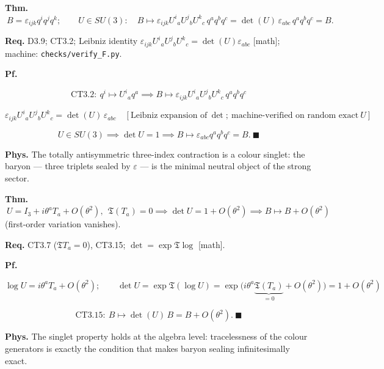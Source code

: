 \begin{theorem}\label{tag:CT3-15}
\textbf{Thm.} $\ B=\varepsilon_{ijk}q^iq^jq^k;\qquad U\in SU(3):\quad B\mapsto\varepsilon_{ijk}U^i{}_aU^j{}_bU^k{}_c\,q^aq^bq^c=\det(U)\,\varepsilon_{abc}\,q^aq^bq^c=B.$

\textbf{Req.} D3.9; CT3.2; Leibniz identity $\varepsilon_{ijk}U^i{}_aU^j{}_bU^k{}_c=\det(U)\varepsilon_{abc}$ [math]; machine: \texttt{checks/\allowbreak{}verify\_\allowbreak{}F.py}.

\textbf{Pf.}

\[
\mathrm{CT3.2}:\ q^i\mapsto U^i{}_aq^a\implies B\mapsto\varepsilon_{ijk}U^i{}_aU^j{}_bU^k{}_c\,q^aq^bq^c
\]

\[
\varepsilon_{ijk}U^i{}_aU^j{}_bU^k{}_c=\det(U)\,\varepsilon_{abc}\quad[\text{Leibniz expansion of}\ \det;\ \text{machine-verified on random exact}\ U]
\]

\[
U\in SU(3)\implies\det U=1\implies B\mapsto\varepsilon_{abc}q^aq^bq^c=B.\ \blacksquare
\]

\textbf{Phys.} The totally antisymmetric three-index contraction is a colour singlet: the baryon — three triplets sealed by $\varepsilon$ — is the minimal neutral object of the strong sector.

\end{theorem}

\begin{theorem}\label{tag:CT3-16}
\textbf{Thm.} $\ U=I_3+i\theta^aT_a+O(\theta^2),\ \ \mathfrak T(T_a)=0\implies\det U=1+O(\theta^2)\implies B\mapsto B+O(\theta^2)$ (first-order variation vanishes).

\textbf{Req.} CT3.7 ($\mathfrak T T_a=0$), CT3.15; $\det=\exp\mathfrak T\log$ [math].

\textbf{Pf.}

\[
\log U=i\theta^aT_a+O(\theta^2);\qquad
\det U=\exp\mathfrak T(\log U)=\exp\bigl(i\theta^a\underbrace{\mathfrak T(T_a)}_{=0}+O(\theta^2)\bigr)=1+O(\theta^2)
\]

\[
\mathrm{CT3.15}:\ B\mapsto\det(U)\,B=B+O(\theta^2).\ \blacksquare
\]

\textbf{Phys.} The singlet property holds at the algebra level: tracelessness of the colour generators is exactly the condition that makes baryon sealing infinitesimally exact.

\end{theorem}

